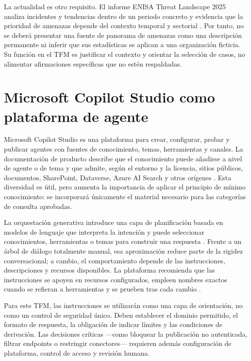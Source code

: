\documentclass[12pt,twoside,titlepage]{book}
\begin{document}
La actualidad es otro requisito. El informe ENISA Threat Landscape 2025 analiza
incidentes y tendencias dentro de un periodo concreto y evidencia que la
prioridad de amenazas depende del contexto temporal y sectorial
\cite{enisaThreat2025}. Por tanto, no se deberá presentar una fuente de panorama
de amenazas como una descripción permanente ni inferir que sus estadísticas se
aplican a una organización ficticia. Su función en el TFM es justificar el
contexto y orientar la selección de casos, no alimentar afirmaciones específicas
que no estén respaldadas.

\section{Microsoft Copilot Studio como plataforma de agente}
\label{sec:copilot-studio}

Microsoft Copilot Studio es una plataforma para crear, configurar, probar y
publicar agentes con fuentes de conocimiento, temas, herramientas y canales. La
documentación de producto describe que el conocimiento puede añadirse a nivel de
agente o de tema y que admite, según el entorno y la licencia, sitios públicos,
documentos, SharePoint, Dataverse, Azure AI Search y otros orígenes
\cite{copilotKnowledge}. Esta diversidad es útil, pero aumenta la importancia de
aplicar el principio de mínimo conocimiento: se incorporará únicamente el
material necesario para las categorías de consulta aprobadas.

La orquestación generativa introduce una capa de planificación basada en modelos
de lenguaje que interpreta la intención y puede seleccionar conocimientos,
herramientas o temas para construir una respuesta \cite{copilotOrchestration}.
Frente a un árbol de diálogo totalmente manual, esa aproximación reduce parte de
la rigidez conversacional; a cambio, el comportamiento depende de las
instrucciones, descripciones y recursos disponibles. La plataforma recomienda
que las instrucciones se apoyen en recursos configurados, empleen nombres
exactos cuando se refieran a herramientas y se prueben tras cada cambio
\cite{copilotInstructions}.

Para este TFM, las instrucciones se utilizarán como una capa de orientación, no
como un control de seguridad único. Deben establecer el dominio permitido, el
formato de respuesta, la obligación de indicar límites y las condiciones de
derivación. Las decisiones críticas ---como bloquear la publicación no
autenticada, filtrar endpoints o restringir conectores--- requieren además
configuración de plataforma, control de acceso y revisión humana.
\end{document}
